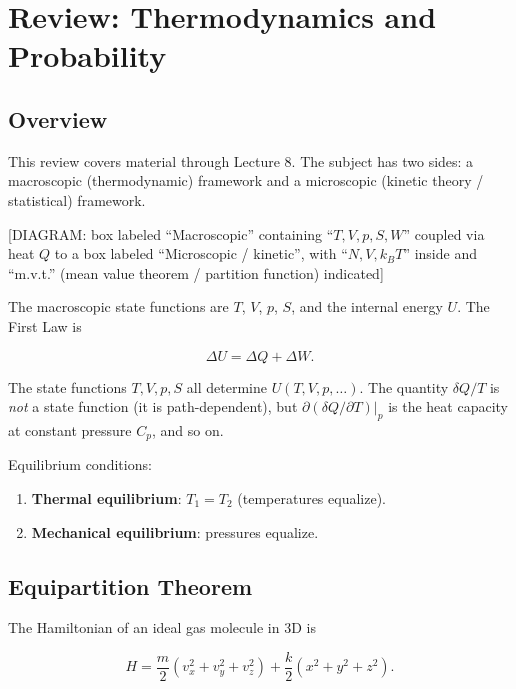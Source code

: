\section{Review: Thermodynamics and Probability}

\subsection{Overview}

This review covers material through Lecture 8. The subject has two sides: a macroscopic (thermodynamic) framework and a microscopic (kinetic theory / statistical) framework.

\begin{center}[DIAGRAM: box labeled ``Macroscopic'' containing ``$T,V,p,S,W$'' coupled via heat $Q$ to a box labeled ``Microscopic / kinetic'', with ``$N,V,k_BT$'' inside and ``m.v.t.'' (mean value theorem / partition function) indicated]\end{center}

The macroscopic state functions are $T$, $V$, $p$, $S$, and the internal energy $U$. The First Law is

\begin{equation}
  \Delta U = \Delta Q + \Delta W.
\end{equation}

The state functions $T,V,p,S$ all determine $U(T,V,p,\ldots)$. The quantity $\delta Q/T$ is \emph{not} a state function (it is path-dependent), but $\partial(\delta Q/\partial T)\big|_p$ is the heat capacity at constant pressure $C_p$, and so on.

Equilibrium conditions:
\begin{enumerate}
  \item \textbf{Thermal equilibrium}: $T_1=T_2$ (temperatures equalize).
  \item \textbf{Mechanical equilibrium}: pressures equalize.
\end{enumerate}

\subsection{Equipartition Theorem}

The Hamiltonian of an ideal gas molecule in 3D is

\begin{equation}
  H = \frac{m}{2}\!\left(v_x^2+v_y^2+v_z^2\right) + \frac{k}{2}\!\left(x^2+y^2+z^2\right).
\end{equation}

